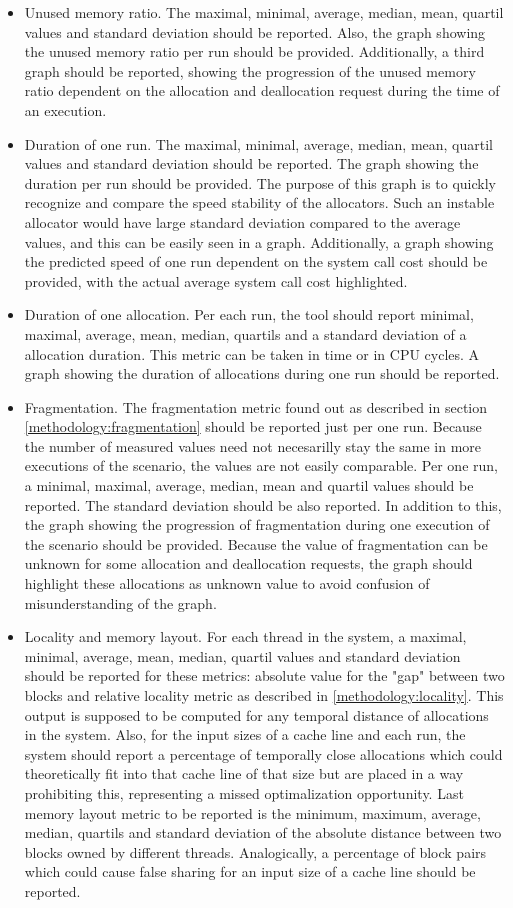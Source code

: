 \begin{itemize}
\item Unused memory ratio. The maximal, minimal, average, median, mean, quartil values and standard deviation should be reported. Also, the graph showing the unused memory ratio per run should be provided. Additionally, a third graph should be reported, showing the progression of the unused memory ratio dependent on the allocation and deallocation request during the time of an execution.
\item Duration of one run. The maximal, minimal, average, median, mean, quartil values and standard deviation should be reported. The graph showing the duration per run should be provided. The purpose of this graph is to quickly recognize and compare the speed stability of the allocators. Such an instable allocator would have large standard deviation compared to the average values, and this can be easily seen in a graph. Additionally, a graph showing the predicted speed of one run dependent on the system call cost should be provided, with the actual average system call cost highlighted.
\item Duration of one allocation. Per each run, the tool should report minimal, maximal, average, mean, median, quartils and a standard deviation of a allocation duration. This metric can be taken in time or in CPU cycles. A graph showing the duration of allocations during one run should be reported. 
\item Fragmentation. The fragmentation metric found out as described in section \ref{methodology:fragmentation} should be reported just per one run. Because the number of measured values need not necesarilly stay the same in more executions of the scenario, the values are not easily comparable. Per one run, a minimal, maximal, average, median, mean and quartil values should be reported. The standard deviation should be also reported. In addition to this, the graph showing the progression of fragmentation during one execution of the scenario should be provided. Because the value of fragmentation can be unknown for some allocation and deallocation requests, the graph should highlight these allocations as unknown value to avoid confusion of misunderstanding of the graph.
\item Locality and memory layout. For each thread in the system, a maximal, minimal, average, mean, median, quartil values and standard deviation should be reported for these metrics: absolute value for the "gap" between two blocks and relative locality metric as described in \ref{methodology:locality}. This output is supposed to be computed for any temporal distance of allocations in the system. Also, for the input sizes of a cache line and each run, the system should report a percentage of temporally close allocations which could theoretically fit into that cache line of that size but are placed in a way prohibiting this, representing a missed optimalization opportunity. Last memory layout metric to be reported is the minimum, maximum, average, median, quartils and standard deviation of the absolute distance between two blocks owned by different threads. Analogically, a percentage of block pairs which could cause false sharing for an input size of a cache line should be reported.

\end{itemize}
